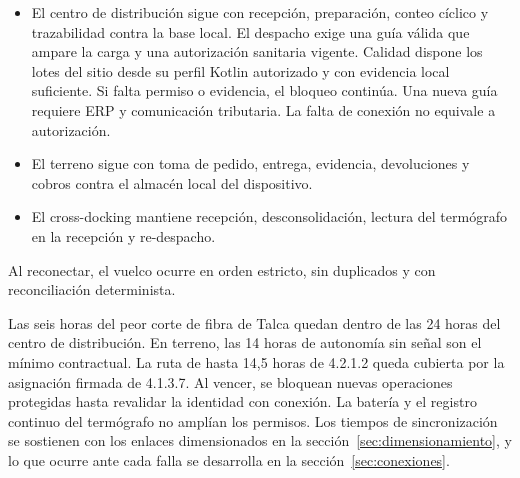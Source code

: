 \begin{itemize}
\item El centro de distribución sigue con recepción, preparación, conteo cíclico y trazabilidad contra la base local. El despacho exige una guía válida que ampare la carga y una autorización sanitaria vigente. Calidad dispone los lotes del sitio desde su perfil Kotlin autorizado y con evidencia local suficiente. Si falta permiso o evidencia, el bloqueo continúa. Una nueva guía requiere ERP y comunicación tributaria. La falta de conexión no equivale a autorización.
  \item El terreno sigue con toma de pedido, entrega, evidencia, devoluciones y cobros contra el almacén local del dispositivo.
  \item El cross-docking mantiene recepción, desconsolidación, lectura del termógrafo en la recepción y re-despacho.
\end{itemize}

Al reconectar, el vuelco ocurre en orden estricto, sin duplicados y con reconciliación determinista.

Las seis horas del peor corte de fibra de Talca quedan dentro de las 24 horas del centro de distribución. En terreno, las 14 horas de autonomía sin señal son el mínimo contractual. La ruta de hasta 14,5 horas de 4.2.1.2 queda cubierta por la asignación firmada de 4.1.3.7. Al vencer, se bloquean nuevas operaciones protegidas hasta revalidar la identidad con conexión. La batería y el registro continuo del termógrafo no amplían los permisos. Los tiempos de sincronización se sostienen con los enlaces dimensionados en la sección~\ref{sec:dimensionamiento}, y lo que ocurre ante cada falla se desarrolla en la sección~\ref{sec:conexiones}.

\label{fuente-02-a-emplazamiento-fin}
